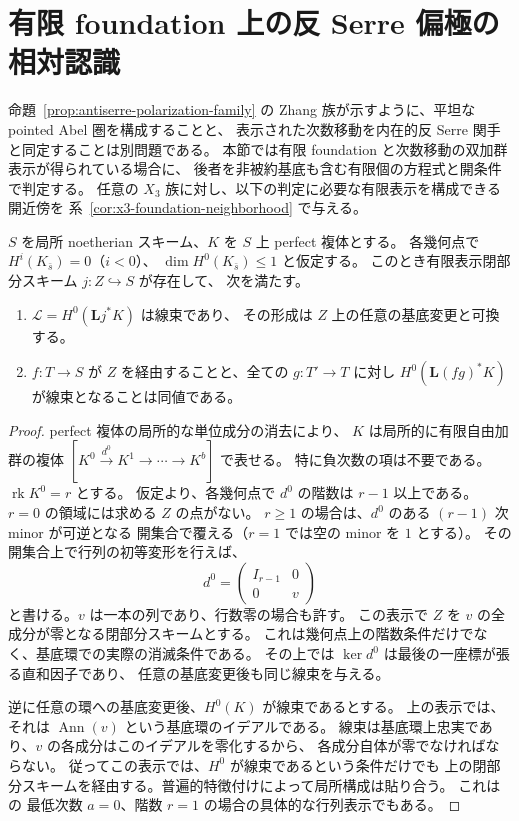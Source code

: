 \section{有限 foundation 上の反 Serre 偏極の相対認識}
\label{sec:finite-polarization-recognition}

命題~\ref{prop:antiserre-polarization-family} の Zhang 族が示すように、平坦な pointed Abel 圏を構成することと、
表示された次数移動を内在的反 Serre 関手と同定することは別問題である。
本節では有限 foundation と次数移動の双加群表示が得られている場合に、
後者を非被約基底も含む有限個の方程式と開条件で判定する。
任意の $X_3$ 族に対し、以下の判定に必要な有限表示を構成できる開近傍を
系~\ref{cor:x3-foundation-neighborhood} で与える。

\begin{lemma}
\label{lem:lowest-hom-line-locus}
$S$ を局所 noetherian スキーム、$K$ を $S$ 上 perfect 複体とする。
各幾何点で $H^i(K_{\bar s})=0$（$i<0$）、
$\dim H^0(K_{\bar s})\le1$ と仮定する。
このとき有限表示閉部分スキーム $j:Z\hookrightarrow S$ が存在して、
次を満たす。
\begin{enumerate}
\item $\mathcal L=H^0(\mathbf L j^*K)$ は線束であり、
その形成は $Z$ 上の任意の基底変更と可換する。
\item $f:T\to S$ が $Z$ を経由することと、全ての
$g:T'\to T$ に対し $H^0(\mathbf L(fg)^*K)$ が線束となることは同値である。
\end{enumerate}
\end{lemma}
\begin{proof}
perfect 複体の局所的な単位成分の消去により、
$K$ は局所的に有限自由加群の複体
$[K^0\xrightarrow{d^0}K^1\to\cdots\to K^b]$ で表せる。
特に負次数の項は不要である。
$\operatorname{rk}K^0=r$ とする。
仮定より、各幾何点で $d^0$ の階数は $r-1$ 以上である。
$r=0$ の領域には求める $Z$ の点がない。
$r\ge1$ の場合は、$d^0$ のある $(r-1)$ 次 minor が可逆となる
開集合で覆える（$r=1$ では空の minor を $1$ とする）。
その開集合上で行列の初等変形を行えば、
\[
 d^0=\begin{pmatrix}I_{r-1}&0\\0&v\end{pmatrix}
\]
と書ける。$v$ は一本の列であり、行数零の場合も許す。
この表示で $Z$ を $v$ の全成分が零となる閉部分スキームとする。
これは幾何点上の階数条件だけでなく、基底環での実際の消滅条件である。
その上では $\ker d^0$ は最後の一座標が張る直和因子であり、
任意の基底変更後も同じ線束を与える。

逆に任意の環への基底変更後、$H^0(K)$ が線束であるとする。
上の表示では、それは $\operatorname{Ann}(v)$ という基底環のイデアルである。
線束は基底環上忠実であり、$v$ の各成分はこのイデアルを零化するから、
各成分自体が零でなければならない。
従ってこの表示では、$H^0$ が線束であるという条件だけでも
上の閉部分スキームを経由する。普遍的特徴付けによって局所構成は貼り合う。
これは \cite[Tag 0BDH, Lemma 36.31.4]{StacksModuli} の
最低次数 $a=0$、階数 $r=1$ の場合の具体的な行列表示でもある。
\end{proof}

